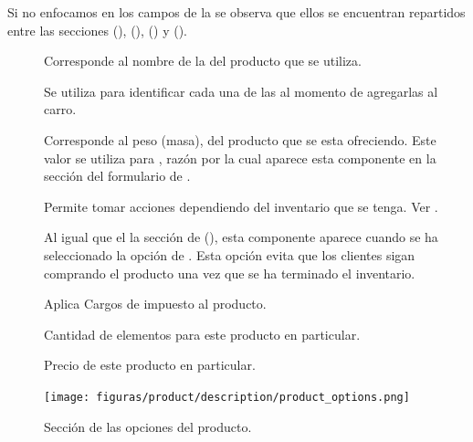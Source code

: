 		Si no enfocamos en los campos de la  se observa que ellos se encuentran repartidos entre las secciones \PricingForm(), \InventoryForm(), \ShippingForm() y \VariantsForm().

		\begin{description}
			\item [\LabelForm]
				Corresponde al nombre de la \VariantsForm del producto que se utiliza.

			\item [\OptionForm]
				Se utiliza para identificar cada una de las \VariantsForm al momento de agregarlas al carro.

			\item [\WeightForm]
				Corresponde al peso (masa), del producto que se esta ofreciendo. Este valor se utiliza para \shipping, razón por la cual aparece esta componente en la sección \ShippingForm del formulario de \shopifyNAME {}.

			\item [\trackingForm]
				Permite tomar acciones dependiendo del inventario que se tenga. Ver .

			\item [\denyForm]
				Al igual que el la sección \InventoryForm de \shopifyNAME(), esta componente aparece cuando se ha seleccionado la opción de \trackingForm. Esta opción evita que los clientes sigan comprando el producto una vez que se ha terminado el inventario.

			\item [\taxableForm]
				Aplica Cargos de impuesto al producto.

			\item [\quantityForm]
				Cantidad de elementos para este producto en particular.

			\item [\priceForm]
				Precio de este producto en particular.
		\end{description}

		\begin{figure}[H]
			\centering
			\texttt{[image: figuras/product/description/product\_options.png]}

			\caption{Sección de las opciones del producto.}
			\label{figure:product:description:product_options}
		\end{figure}

